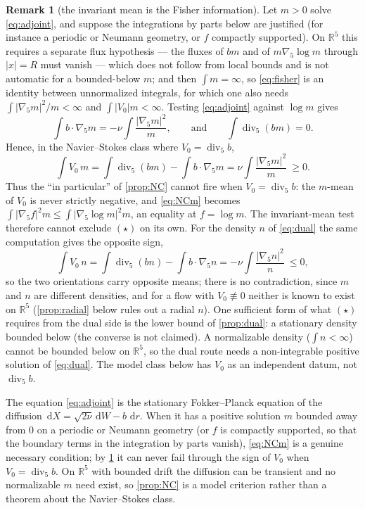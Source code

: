\documentclass[11pt]{article}
\theoremstyle{definition}
\newtheorem{remark}[theorem]{Remark}
\newcommand{\R}{\mathbb{R}}
\newcommand{\dd}{\,\mathrm{d}}
\newcommand{\Div}{\operatorname{div}}
\begin{document}
\begin{remark}[the invariant mean is the Fisher information]\label{rem:fisher}
Let $m>0$ solve \eqref{eq:adjoint}, and suppose the integrations by parts below
are justified (for instance a periodic or Neumann geometry, or $f$ compactly
supported). On $\R^5$ this requires a separate flux hypothesis --- the fluxes
of $bm$ and of $m\nabla_5\log m$ through $|x|=R$ must vanish --- which does not
follow from local bounds and is not automatic for a bounded-below $m$; and
then $\int m=\infty$, so \eqref{eq:fisher} is an identity between unnormalized
integrals, for which one also needs $\int|\nabla_5m|^2/m<\infty$ and
$\int|V_0|m<\infty$.
Testing \eqref{eq:adjoint} against $\log m$ gives
\begin{equation}
\int b\cdot\nabla_5m=-\nu\int\frac{|\nabla_5m|^2}{m},
\qquad\text{and}\qquad
\int\Div_5(bm)=0 .
\end{equation}
Hence, in the Navier--Stokes class where $V_0=\Div_5b$,
\begin{equation}\label{eq:fisher}
\int V_0\,m=\int\Div_5(bm)-\int b\cdot\nabla_5m
=\nu\int\frac{|\nabla_5m|^2}{m}\ \ge0 .
\end{equation}
Thus the ``in particular'' of \cref{prop:NC} cannot fire when $V_0=\Div_5b$:
the $m$-mean of $V_0$ is never strictly negative, and \eqref{eq:NCm} becomes
$\int|\nabla_5f|^2m\le\int|\nabla_5\log m|^2m$, an equality at $f=\log m$.
The invariant-mean test therefore cannot exclude $(\star)$ on its own. For the
density $n$ of \eqref{eq:dual} the same computation gives the opposite sign,
\begin{equation}\label{eq:fisher2}
\int V_0\,n=\int\Div_5(bn)-\int b\cdot\nabla_5n
=-\nu\int\frac{|\nabla_5n|^2}{n}\ \le0 ,
\end{equation}
so the two orientations carry opposite means; there is no contradiction, since
$m$ and $n$ are different densities, and for a flow with $V_0\not\equiv0$
neither is known to exist on $\R^5$ (\cref{prop:radial} below rules out a
radial $n$).
One sufficient form of what $(\star)$ requires from the dual side is the lower
bound of \cref{prop:dual}: a stationary density bounded below (the converse is
not claimed). A normalizable density ($\int n<\infty$) cannot be bounded below
on $\R^5$, so the dual route needs a non-integrable positive solution of
\eqref{eq:dual}. The model class
below has $V_0$ as an independent datum, not $\Div_5b$.
\end{remark}

The equation \eqref{eq:adjoint} is the stationary Fokker--Planck equation of
the diffusion $\dd X=\sqrt{2\nu}\dd W-b\,\dd r$. When it has a positive
solution $m$ bounded away from $0$ on a periodic or Neumann geometry (or $f$
is compactly supported, so that the boundary terms in the integration by parts
vanish), \eqref{eq:NCm} is a genuine necessary condition; by \cref{rem:fisher}
it can never fail through the sign of $V_0$ when $V_0=\Div_5b$. On $\R^5$ with
bounded drift the diffusion can be transient and no normalizable $m$ need
exist, so \cref{prop:NC} is a model criterion rather than a theorem about the
Navier--Stokes class.
\end{document}
